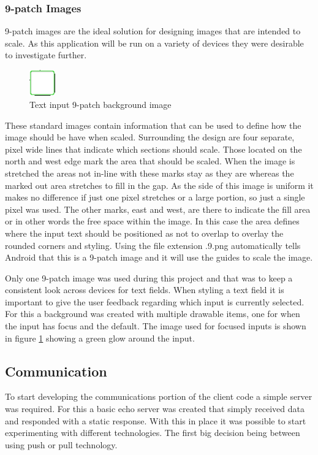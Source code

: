 \subsubsection*{9-patch Images}
9-patch images are the ideal solution for designing images that are intended to scale. As this application will be run on a variety of devices they were desirable to investigate further.

\begin{figure}
  \centering
  \includegraphics[width=0.1\textwidth]{Images/input_green.png}
  \caption{Text input 9-patch background image}
  \label{fig:patch}
\end{figure}

These standard images contain information that can be used to define how the image should be have when scaled. Surrounding the design are four separate, pixel wide lines that indicate which sections should scale. Those located on the north and west edge mark the area that should be scaled. When the image is stretched the areas not in-line with these marks stay as they are whereas the marked out area stretches to fill in the gap. As the side of this image is uniform it makes no difference if just one pixel stretches or a large portion, so just a single pixel was used. The other marks, east and west, are there to indicate the fill area or in other words the free space within the image. In this case the area defines where the input text should be positioned as not to overlap to overlay the rounded corners and styling. Using the file extension .9.png automatically tells Android that this is a 9-patch image and it will use the guides to scale the image. 

Only one 9-patch image was used during this project and that was to keep a consistent look across devices for text fields. When styling a text field it is important to give the user feedback regarding which input is currently selected. For this a background was created with multiple drawable items, one for when the input has focus and the default. The image used for focused inputs is shown in figure \ref{fig:patch} showing a green glow around the input.

\subsection{Communication}
To start developing the communications portion of the client code a simple server was required. For this a basic echo server was created that simply received data and responded with a static response. With this in place it was possible to start experimenting with different technologies. The first big decision being between using push or pull technology.

